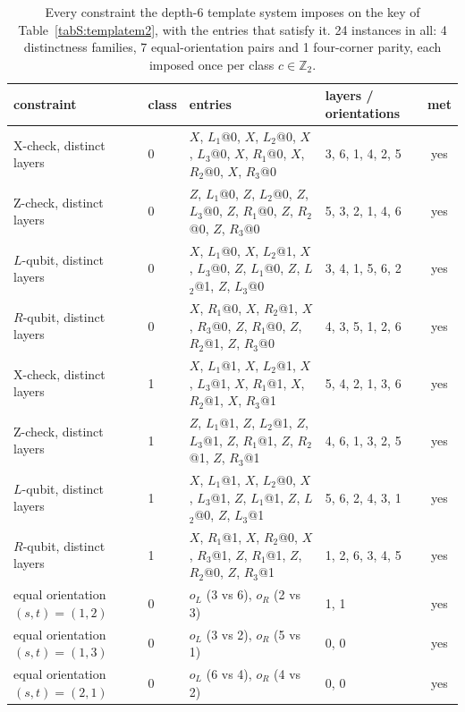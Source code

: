 \begin{table}[tb]
\centering
\small
\caption{Every constraint the depth-6 template system imposes on the key of Table~\ref{tabS:templatem2}, with the entries that satisfy it.  24 instances in all: 4 distinctness families, 7 equal-orientation pairs and 1 four-corner parity, each imposed once per class $c\in\mathbb{Z}_2$.}
\label{tabS:templatem2checks}
\begin{tabular}{llllc}
\toprule
constraint & class & entries & layers / orientations & met \\
\midrule
X-check, distinct layers & 0 & $X$, $L$$_{1}$@0, $X$, $L$$_{2}$@0, $X$, $L$$_{3}$@0, $X$, $R$$_{1}$@0, $X$, $R$$_{2}$@0, $X$, $R$$_{3}$@0 & 3, 6, 1, 4, 2, 5 & yes \\
Z-check, distinct layers & 0 & $Z$, $L$$_{1}$@0, $Z$, $L$$_{2}$@0, $Z$, $L$$_{3}$@0, $Z$, $R$$_{1}$@0, $Z$, $R$$_{2}$@0, $Z$, $R$$_{3}$@0 & 5, 3, 2, 1, 4, 6 & yes \\
$L$-qubit, distinct layers & 0 & $X$, $L$$_{1}$@0, $X$, $L$$_{2}$@1, $X$, $L$$_{3}$@0, $Z$, $L$$_{1}$@0, $Z$, $L$$_{2}$@1, $Z$, $L$$_{3}$@0 & 3, 4, 1, 5, 6, 2 & yes \\
$R$-qubit, distinct layers & 0 & $X$, $R$$_{1}$@0, $X$, $R$$_{2}$@1, $X$, $R$$_{3}$@0, $Z$, $R$$_{1}$@0, $Z$, $R$$_{2}$@1, $Z$, $R$$_{3}$@0 & 4, 3, 5, 1, 2, 6 & yes \\
X-check, distinct layers & 1 & $X$, $L$$_{1}$@1, $X$, $L$$_{2}$@1, $X$, $L$$_{3}$@1, $X$, $R$$_{1}$@1, $X$, $R$$_{2}$@1, $X$, $R$$_{3}$@1 & 5, 4, 2, 1, 3, 6 & yes \\
Z-check, distinct layers & 1 & $Z$, $L$$_{1}$@1, $Z$, $L$$_{2}$@1, $Z$, $L$$_{3}$@1, $Z$, $R$$_{1}$@1, $Z$, $R$$_{2}$@1, $Z$, $R$$_{3}$@1 & 4, 6, 1, 3, 2, 5 & yes \\
$L$-qubit, distinct layers & 1 & $X$, $L$$_{1}$@1, $X$, $L$$_{2}$@0, $X$, $L$$_{3}$@1, $Z$, $L$$_{1}$@1, $Z$, $L$$_{2}$@0, $Z$, $L$$_{3}$@1 & 5, 6, 2, 4, 3, 1 & yes \\
$R$-qubit, distinct layers & 1 & $X$, $R$$_{1}$@1, $X$, $R$$_{2}$@0, $X$, $R$$_{3}$@1, $Z$, $R$$_{1}$@1, $Z$, $R$$_{2}$@0, $Z$, $R$$_{3}$@1 & 1, 2, 6, 3, 4, 5 & yes \\
equal orientation $(s,t)=(1,2)$ & 0 & $o_L$ (3 vs 6), $o_R$ (2 vs 3) & 1, 1 & yes \\
equal orientation $(s,t)=(1,3)$ & 0 & $o_L$ (3 vs 2), $o_R$ (5 vs 1) & 0, 0 & yes \\
equal orientation $(s,t)=(2,1)$ & 0 & $o_L$ (6 vs 4), $o_R$ (4 vs 2) & 0, 0 & yes \\

\end{tabular}
\end{table}
